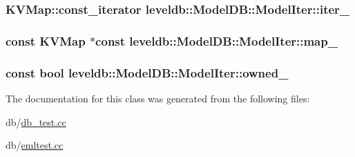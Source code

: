 \subsubsection[{iter\+\_\+}]{\setlength{\rightskip}{0pt plus 5cm}K\+V\+Map\+::const\+\_\+iterator leveldb\+::\+Model\+D\+B\+::\+Model\+Iter\+::iter\+\_\+\hspace{0.3cm}{\ttfamily [private]}}\label{classleveldb_1_1_model_d_b_1_1_model_iter_a8eef8d86a26c6b3c85a9498eb42e1075}
\hypertarget{classleveldb_1_1_model_d_b_1_1_model_iter_ad74301feafbc49fb774c01848202d69f}{}
\subsubsection[{map\+\_\+}]{\setlength{\rightskip}{0pt plus 5cm}const {\bf K\+V\+Map} $\ast$const leveldb\+::\+Model\+D\+B\+::\+Model\+Iter\+::map\+\_\+\hspace{0.3cm}{\ttfamily [private]}}\label{classleveldb_1_1_model_d_b_1_1_model_iter_ad74301feafbc49fb774c01848202d69f}
\hypertarget{classleveldb_1_1_model_d_b_1_1_model_iter_af5a4dd226cf3421411b622f9a9709c61}{}
\subsubsection[{owned\+\_\+}]{\setlength{\rightskip}{0pt plus 5cm}const bool leveldb\+::\+Model\+D\+B\+::\+Model\+Iter\+::owned\+\_\+\hspace{0.3cm}{\ttfamily [private]}}\label{classleveldb_1_1_model_d_b_1_1_model_iter_af5a4dd226cf3421411b622f9a9709c61}


The documentation for this class was generated from the following files\+:\begin{DoxyCompactItemize}
\item 
db/\hyperlink{db__test_8cc}{db\+\_\+test.\+cc}\item 
db/\hyperlink{emltest_8cc}{emltest.\+cc}\end{DoxyCompactItemize}
